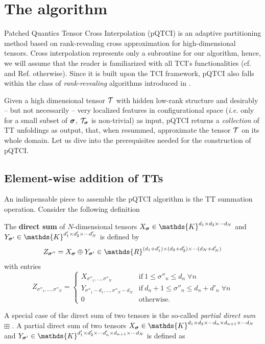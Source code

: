 \section{The algorithm}
\label{sec:patchAlg}

Patched Quantics Tensor Cross Interpolation (pQTCI) is an adaptive partitioning method \cite{Deng2008} based on rank-revealing cross approximation for high-dimensional tensors. Cross interpolation represents only a subroutine for our algorithm, hence, we will assume that the reader is familiarized with all TCI's functionalities (cf.  and Ref. \cite{Fernandez2024} otherwise). Since it is built upon the TCI framework, pQTCI also falls within the class of \emph{rank‑revealing} algorithms introduced in .

Given a high dimensional tensor $\mathcal{T}$ with hidden low-rank structure and desirably -- but not necessarily -- very localized features in configurational space (\textit{i.e.} only for a small subset of $\boldsymbol{\sigma}$, $\mathcal{T}_{\boldsymbol{\sigma}}$ is non-trivial) as input, pQTCI returns a \textit{collection} of TT unfoldings as output, that, when resummed, approximate the tensor $\mathcal{T}$ on its whole domain. Let us dive into the prerequisites needed for the construction of pQTCI.


\subsection{Element-wise addition of TTs}
An indispensable piece to assemble the pQTCI algorithm is the TT summation operation. Consider the following definition
\begin{definition}
	The {\normalfont \textbf{direct sum}} of $N$-dimensional tensors $X_{\bsigma} \in \mathds{K}^{d_1 \times d_2 \times \cdots d_N}$ and $Y_{\bsigma'} \in \mathds{K}^{d'_1 \times d'_2 \times \cdots d'_N}$ is defined by 
	\begin{equation}
		Z_{\bsigma''} = X_{\bsigma} \oplus Y_{\bsigma'} \in \mathds{R}^{(d_1+d'_1) \times (d_2+d'_2) \times \cdots (d_N+d'_N)}
	\end{equation}
	with entries
	\begin{equation}
		Z_{\sigma''_1, \dots, \sigma''_N} = \begin{cases}
			X_{\sigma''_1, \dots, \sigma''_N} & \text{if}\ 1\leq \sigma''_n \leq d_n \;\forall n\\
			Y_{\sigma''_1-d_1, \dots, \sigma''_N-d_N} & \text{if}\ d_n + 1\leq \sigma''_n \leq d_n + d'_n \;\forall n\\
			0 & \text{otherwise}.
		\end{cases}
	\end{equation}
\end{definition}
A special case of the direct sum of two tensors is the so-called \textit{partial direct sum} $\boxplus$ \cite{Lee2018}. A partial direct sum of two tensors $X_{\bsigma} \in \mathds{K}^{d_1 \times d_2 \times \cdots d_n \times d_{n+1} \times \cdots d_N}$ and $Y_{\bsigma'} \in \mathds{K}^{d'_1 \times d'_2 \times \cdots d'_n \times d_{n+1} \times \cdots d_N}$ is defined as 

